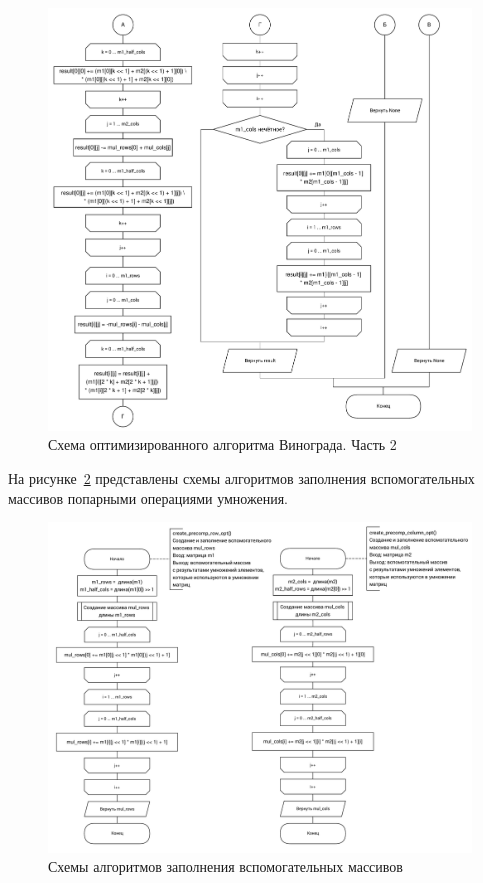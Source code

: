 \begin{figure}[H]
\centering
\includegraphics[width=\textwidth]{inc/img/winograd_opt_2.pdf}
\caption{Схема оптимизированного алгоритма Винограда. Часть 2}
\label{fig:winograd_opt_scheme_2}
\end{figure}

На рисунке~\ref{fig:winograd_opt_scheme_3} представлены схемы алгоритмов заполнения вспомогательных массивов попарными операциями умножения.

\begin{figure}[H]
\centering
\includegraphics[width=\textwidth]{inc/img/winograd_opt_3.pdf}
\caption{Схемы алгоритмов заполнения вспомогательных массивов}
\label{fig:winograd_opt_scheme_3}
\end{figure}

